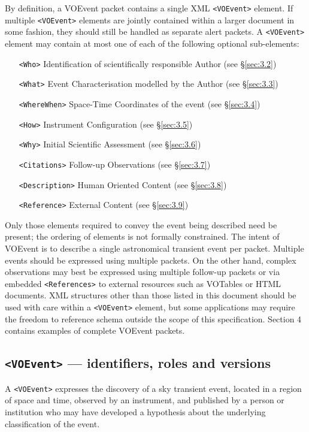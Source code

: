 \documentclass[11pt,a4paper]{ivoa}
\begin{document}
By definition, a VOEvent packet contains a single XML \verb|<VOEvent>| element.
If multiple \verb|<VOEvent>| elements are jointly contained within a larger
document in some fashion, they should still be handled as separate alert
packets. A \verb|<VOEvent>| element may contain at most one of each of the
following optional sub-elements:
\begin{itemize}
\item[\tt <Who>] Identification of scientifically responsible Author (see
\S\ref{sec:3.2})
\item[\tt <What>] Event Characterisation modelled by the Author (see
\S\ref{sec:3.3})
\item[\tt <WhereWhen>] Space-Time Coordinates of the event (see \S\ref{sec:3.4})
\item[\tt <How>] Instrument Configuration (see \S\ref{sec:3.5})
\item[\tt <Why>] Initial Scientific Assessment (see \S\ref{sec:3.6})
\item[\tt <Citations>] Follow-up Observations (see \S\ref{sec:3.7})
\item[\tt <Description>] Human Oriented Content (see \S\ref{sec:3.8})
\item[\tt <Reference>] External Content (see \S\ref{sec:3.9})
\end{itemize}

Only those elements required to convey the event being described need be
present; the ordering of elements is not formally constrained. The intent of
VOEvent is to describe a single astronomical transient event per packet.
Multiple events should be expressed using multiple packets. On the other hand,
complex observations may best be expressed using multiple follow-up packets or
via embedded \verb|<References>| to external resources such as VOTables or HTML
documents. XML structures other than those listed in this document should be
used with care within a \verb|<VOEvent>| element, but some applications may
require the freedom to reference schema outside the scope of this specification.
Section 4 contains examples of complete VOEvent packets.

\subsection{\texttt{<VOEvent>} --- identifiers, roles and versions}
\label{sec:3.1}
A \verb|<VOEvent>| expresses the discovery of a sky transient event, located in a
region of space and time, observed by an instrument, and published by a person
or institution who may have developed a hypothesis about the underlying
classification of the event.
\end{document}
